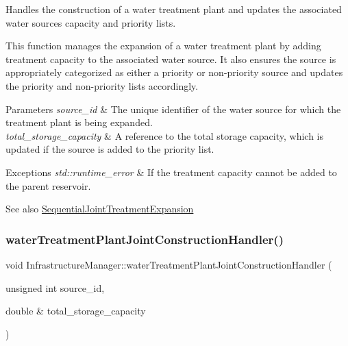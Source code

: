 Handles the construction of a water treatment plant and updates the associated water source\textquotesingle{}s capacity and priority lists. 

This function manages the expansion of a water treatment plant by adding treatment capacity to the associated water source. It also ensures the source is appropriately categorized as either a priority or non-\/priority source and updates the priority and non-\/priority lists accordingly.


\begin{DoxyParams}{Parameters}
{\em source\+\_\+id} & The unique identifier of the water source for which the treatment plant is being expanded. \\
\hline
{\em total\+\_\+storage\+\_\+capacity} & A reference to the total storage capacity, which is updated if the source is added to the priority list.\\
\hline
\end{DoxyParams}

\begin{DoxyExceptions}{Exceptions}
{\em std\+::runtime\+\_\+error} & If the treatment capacity cannot be added to the parent reservoir. \\
\hline
\end{DoxyExceptions}
\begin{DoxySeeAlso}{See also}
\mbox{\hyperlink{classSequentialJointTreatmentExpansion}{Sequential\+Joint\+Treatment\+Expansion}} 
\end{DoxySeeAlso}
\mbox{\label{classInfrastructureManager_a669881b881b090b3dd8fe70e3ffbf7f6}} 
\subsubsection{\texorpdfstring{water\+Treatment\+Plant\+Joint\+Construction\+Handler()}{waterTreatmentPlantJointConstructionHandler()}}
{\footnotesize\ttfamily void Infrastructure\+Manager\+::water\+Treatment\+Plant\+Joint\+Construction\+Handler (\begin{DoxyParamCaption}\item[{unsigned int}]{source\+\_\+id,  }\item[{double \&}]{total\+\_\+storage\+\_\+capacity }\end{DoxyParamCaption})}



